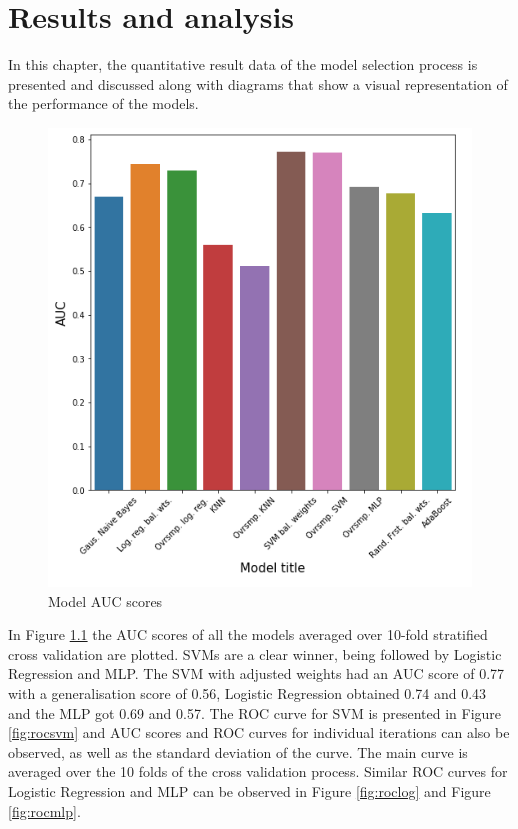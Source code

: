 \chapter{Results and analysis}

In this chapter, the quantitative result data of the model selection process is presented and discussed along with diagrams that show a visual representation of the performance of the models.

\begin{figure}[h]
\centering
\includegraphics[width=0.9\linewidth]{results/fig/barplot.PNG}
\caption{Model AUC scores}
\label{fig:barplot}
\end{figure}

In Figure \ref{fig:barplot} the AUC scores of all the models averaged over 10-fold stratified cross validation are plotted. SVMs are a clear winner, being followed by Logistic Regression and MLP. The SVM with adjusted weights had an AUC score of 0.77 with a generalisation score of 0.56, Logistic Regression obtained 0.74 and 0.43 and the MLP got 0.69 and 0.57. The ROC curve for SVM is presented in Figure \ref{fig:rocsvm} and AUC scores and ROC curves for individual iterations can also be observed, as well as the standard deviation of the curve. The main curve is averaged over the 10 folds of the cross validation process. Similar ROC curves for Logistic Regression and MLP can be observed in Figure \ref{fig:roclog} and Figure \ref{fig:rocmlp}. 

